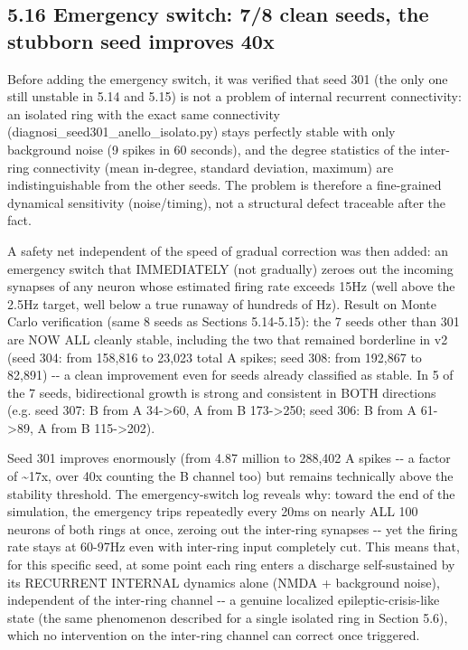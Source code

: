 \documentclass[
  english,
]{article}
\begin{document}

\subsection{5.16 Emergency switch: 7/8 clean seeds, the stubborn seed improves 40x}\label{emergency-switch-78-clean-seeds-the-stubborn-seed-improves-40x}

Before adding the emergency switch, it was verified that seed 301 (the only one still unstable in 5.14 and 5.15) is not a problem of internal recurrent connectivity: an isolated ring with the exact same connectivity (diagnosi\_\allowbreak{}seed301\_\allowbreak{}anello\_\allowbreak{}isolato.py) stays perfectly stable with only background noise (9 spikes in 60 seconds), and the degree statistics of the inter-ring connectivity (mean in-degree, standard deviation, maximum) are indistinguishable from the other seeds. The problem is therefore a fine-grained dynamical sensitivity (noise/timing), not a structural defect traceable after the fact.

A safety net independent of the speed of gradual correction was then added: an emergency switch that IMMEDIATELY (not gradually) zeroes out the incoming synapses of any neuron whose estimated firing rate exceeds 15Hz (well above the 2.5Hz target, well below a true runaway of hundreds of Hz). Result on Monte Carlo verification (same 8 seeds as Sections 5.14-5.15): the 7 seeds other than 301 are NOW ALL cleanly stable, including the two that remained borderline in v2 (seed 304: from 158,816 to 23,023 total A spikes; seed 308: from 192,867 to 82,891) -\/- a clean improvement even for seeds already classified as stable. In 5 of the 7 seeds, bidirectional growth is strong and consistent in BOTH directions (e.g. seed 307: B from A 34-\textgreater60, A from B 173-\textgreater250; seed 306: B from A 61-\textgreater89, A from B 115-\textgreater202).

Seed 301 improves enormously (from 4.87 million to 288,402 A spikes -\/- a factor of \textasciitilde17x, over 40x counting the B channel too) but remains technically above the stability threshold. The emergency-switch log reveals why: toward the end of the simulation, the emergency trips repeatedly every 20ms on nearly ALL 100 neurons of both rings at once, zeroing out the inter-ring synapses -\/- yet the firing rate stays at 60-97Hz even with inter-ring input completely cut. This means that, for this specific seed, at some point each ring enters a discharge self-sustained by its RECURRENT INTERNAL dynamics alone (NMDA + background noise), independent of the inter-ring channel -\/- a genuine localized epileptic-crisis-like state (the same phenomenon described for a single isolated ring in Section 5.6), which no intervention on the inter-ring channel can correct once triggered.
\end{document}
